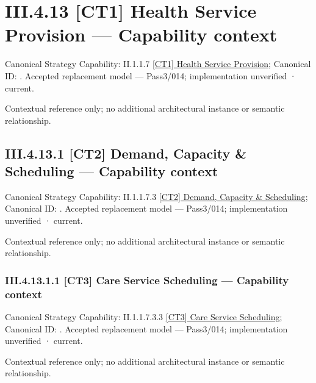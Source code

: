 \section*{III.4.13 [CT1] Health Service Provision — Capability context}
\label{navigation:III.4.13}

{\small Canonical Strategy Capability: II.1.1.7 \hyperref[element:c832a767d295445d8925dd0af885950e]{[CT1] Health Service Provision}; Canonical ID: \texttt{}. Accepted replacement model — Pass3/014; implementation unverified · current.}\par
Contextual reference only; no additional architectural instance or semantic relationship.\par
\subsection*{III.4.13.1 [CT2] Demand, Capacity \& Scheduling — Capability context}
\label{navigation:III.4.13.1}

{\small Canonical Strategy Capability: II.1.1.7.3 \hyperref[element:f94ce7fcb1904141aeae8f2602518126]{[CT2] Demand, Capacity \& Scheduling}; Canonical ID: \texttt{}. Accepted replacement model — Pass3/014; implementation unverified · current.}\par
Contextual reference only; no additional architectural instance or semantic relationship.\par
\subsubsection*{III.4.13.1.1 [CT3] Care Service Scheduling — Capability context}
\label{navigation:III.4.13.1.1}

{\small Canonical Strategy Capability: II.1.1.7.3.3 \hyperref[element:e77883e9c25c43fabdfb7dbeb8fbffe3]{[CT3] Care Service Scheduling}; Canonical ID: \texttt{}. Accepted replacement model — Pass3/014; implementation unverified · current.}\par
Contextual reference only; no additional architectural instance or semantic relationship.\par
